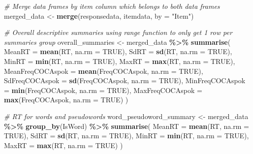 \documentclass[
]{article}
\newenvironment{Shaded}{\begin{snugshade}}{\end{snugshade}}
\newcommand{\AttributeTok}[1]{\textcolor[rgb]{0.13,0.29,0.53}{#1}}
\newcommand{\CommentTok}[1]{\textcolor[rgb]{0.56,0.35,0.01}{\textit{#1}}}
\newcommand{\ConstantTok}[1]{\textcolor[rgb]{0.56,0.35,0.01}{#1}}
\newcommand{\FunctionTok}[1]{\textcolor[rgb]{0.13,0.29,0.53}{\textbf{#1}}}
\newcommand{\NormalTok}[1]{#1}
\newcommand{\OtherTok}[1]{\textcolor[rgb]{0.56,0.35,0.01}{#1}}
\newcommand{\SpecialCharTok}[1]{\textcolor[rgb]{0.81,0.36,0.00}{\textbf{#1}}}
\newcommand{\StringTok}[1]{\textcolor[rgb]{0.31,0.60,0.02}{#1}}
\begin{document}
\begin{Shaded}
\begin{Highlighting}[]
\CommentTok{\# Merge data frames by item column which belongs to both data frames}
\NormalTok{merged\_data }\OtherTok{\textless{}{-}} \FunctionTok{merge}\NormalTok{(responsedata, itemdata, }\AttributeTok{by =} \StringTok{"Item"}\NormalTok{)}


\CommentTok{\# Overall descriptive summaries using range function to only get 1 row per summaries group}
\NormalTok{overall\_summaries }\OtherTok{\textless{}{-}}\NormalTok{ merged\_data }\SpecialCharTok{\%\textgreater{}\%}
  \FunctionTok{summarise}\NormalTok{(}
    \AttributeTok{MeanRT =} \FunctionTok{mean}\NormalTok{(RT, }\AttributeTok{na.rm =} \ConstantTok{TRUE}\NormalTok{),}
    \AttributeTok{SdRT =} \FunctionTok{sd}\NormalTok{(RT, }\AttributeTok{na.rm =} \ConstantTok{TRUE}\NormalTok{),}
    \AttributeTok{MinRT =} \FunctionTok{min}\NormalTok{(RT, }\AttributeTok{na.rm =} \ConstantTok{TRUE}\NormalTok{),}
    \AttributeTok{MaxRT =} \FunctionTok{max}\NormalTok{(RT, }\AttributeTok{na.rm =} \ConstantTok{TRUE}\NormalTok{),}
    \AttributeTok{MeanFreqCOCAspok =} \FunctionTok{mean}\NormalTok{(FreqCOCAspok, }\AttributeTok{na.rm =} \ConstantTok{TRUE}\NormalTok{),}
    \AttributeTok{SdFreqCOCAspok =} \FunctionTok{sd}\NormalTok{(FreqCOCAspok, }\AttributeTok{na.rm =} \ConstantTok{TRUE}\NormalTok{),}
    \AttributeTok{MinFreqCOCAspok =} \FunctionTok{min}\NormalTok{(FreqCOCAspok, }\AttributeTok{na.rm =} \ConstantTok{TRUE}\NormalTok{),}
    \AttributeTok{MaxFreqCOCAspok =} \FunctionTok{max}\NormalTok{(FreqCOCAspok, }\AttributeTok{na.rm =} \ConstantTok{TRUE}\NormalTok{)}
\NormalTok{  )}

\CommentTok{\# RT for words and pseudowords}
\NormalTok{word\_pseudoword\_summary }\OtherTok{\textless{}{-}}\NormalTok{ merged\_data }\SpecialCharTok{\%\textgreater{}\%}
  \FunctionTok{group\_by}\NormalTok{(IsWord) }\SpecialCharTok{\%\textgreater{}\%}
  \FunctionTok{summarise}\NormalTok{(}
    \AttributeTok{MeanRT =} \FunctionTok{mean}\NormalTok{(RT, }\AttributeTok{na.rm =} \ConstantTok{TRUE}\NormalTok{),}
    \AttributeTok{SdRT =} \FunctionTok{sd}\NormalTok{(RT, }\AttributeTok{na.rm =} \ConstantTok{TRUE}\NormalTok{),}
    \AttributeTok{MinRT =} \FunctionTok{min}\NormalTok{(RT, }\AttributeTok{na.rm =} \ConstantTok{TRUE}\NormalTok{),}
    \AttributeTok{MaxRT =} \FunctionTok{max}\NormalTok{(RT, }\AttributeTok{na.rm =} \ConstantTok{TRUE}\NormalTok{)}
\NormalTok{  )}


\end{Highlighting}
\end{Shaded}
\end{document}
